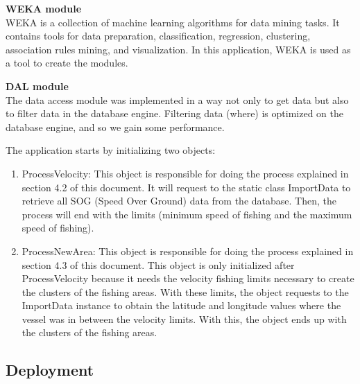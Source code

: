 \textbf{WEKA module} \\WEKA is a collection of machine learning algorithms for data mining tasks. It contains tools for data preparation, classification, regression, clustering, association rules mining, and visualization. In this application, WEKA is used as a tool to create the modules.

\textbf{DAL module} \\The data access module was implemented in a way not only to get data but also to filter data in the database engine. Filtering data (where) is optimized on the database engine, and so we gain some performance.




The application starts by initializing two objects:
\begin{enumerate}
\item ProcessVelocity: This object is responsible for doing the process explained in section 4.2 of this document. It will request to the static class ImportData to retrieve all SOG (Speed Over Ground) data from the database. Then, the process will end with the limits (minimum speed of fishing and the maximum speed of fishing).
\item ProcessNewArea: This object is responsible for doing the process explained in section 4.3 of this document. This object is only initialized after ProcessVelocity because it needs the velocity fishing limits necessary to create the clusters of the fishing areas. With these limits, the object requests to the ImportData instance to obtain the latitude and longitude values where the vessel was in between the velocity limits. With this, the object ends up with the clusters of the fishing areas.
\end{enumerate}



\subsection{Deployment} %
\label{sub:deployment}

